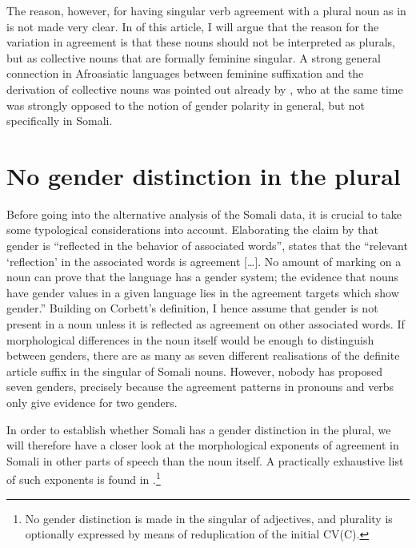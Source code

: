 \documentclass[output=paper]{langsci/langscibook}
\begin{document}
The reason, however, for having singular verb agreement with a plural noun as in  is not made very clear. In  of this article, I will argue that the reason for the variation in agreement is that these nouns should not be interpreted as plurals, but as collective nouns that are formally feminine singular. A strong general connection in Afroasiatic languages between feminine suffixation and the derivation of collective nouns was pointed out already by \citet{Speiser1938}, who at the same time was strongly opposed to the notion of gender polarity in general, but not specifically in Somali.

\section{No gender distinction in the plural}\label{sec:nilsson:2}

Before going into the alternative analysis of the Somali data, it is crucial to take some typological considerations into account. Elaborating the claim by \citet[231]{Hockett1958} that gender is “reflected in the behavior of associated words”, \citet[89--90]{Corbett2000} states that the “relevant ‘reflection’ in the associated words is agreement […]. No amount of marking on a noun can prove that the language has a gender system; the evidence that nouns have gender values in a given language lies in the agreement targets which show gender.” Building on Corbett’s definition, I hence assume that gender is not present in a noun unless it is reflected as agreement on other associated words. If morphological differences in the noun itself would be enough to distinguish between genders, there are as many as seven different realisations of the definite article suffix in the singular of Somali nouns. However, nobody has proposed seven genders, precisely because the agreement patterns in pronouns and verbs only give evidence for two genders. 

In order to establish whether Somali has a gender distinction in the plural, we will therefore have a closer look at the morphological exponents of agreement in Somali in other parts of speech than the noun itself. A practically exhaustive list of such exponents is found in .\footnote{No gender distinction is made in the singular of adjectives, and plurality is optionally expressed by means of reduplication of the initial CV(C).}
\end{document}
